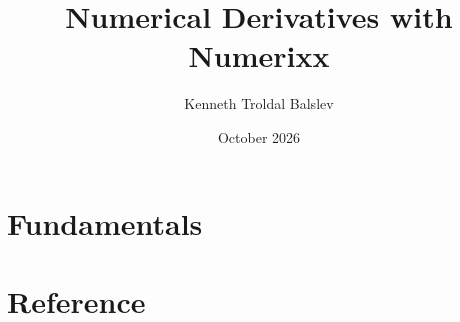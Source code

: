 \documentclass[10pt,a4paper,oneside]{report}
\title{Numerical Derivatives with Numerixx}
\author{Kenneth Troldal Balslev}
\date{October 2026}
\begin{document}
\maketitle


\tableofcontents
\listofsidebars
\cleardoublepage
{}

\part{Fundamentals}







\part{Reference}


\setcounter{topnumber}{3}  %


\appendix
{}  %





\begin{fullbib}

\end{fullbib}


\end{document}
